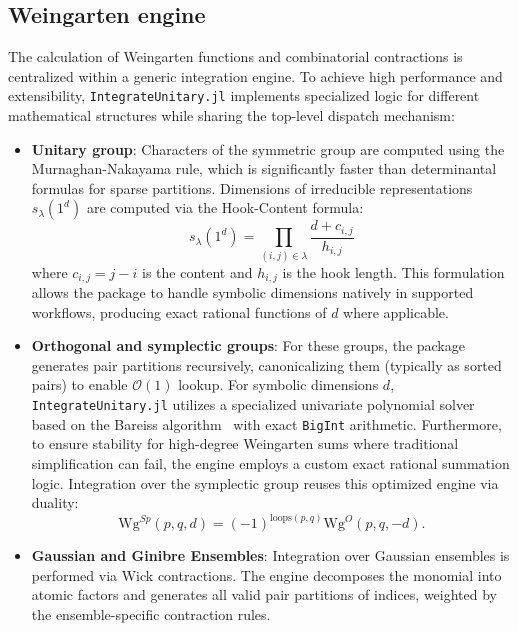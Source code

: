 \documentclass[manuscript,screen]{acmart}
\begin{document}
\subsection{Weingarten engine}
The calculation of Weingarten functions and combinatorial contractions is
centralized within a generic integration engine. To achieve high performance
and extensibility, \texttt{IntegrateUnitary.jl} implements specialized logic for different
mathematical structures while sharing the top-level dispatch mechanism:
\begin{itemize}
    \item \textbf{Unitary group}: Characters of the symmetric group are computed
    using the Murnaghan-Nakayama rule, which is significantly faster than determinantal
    formulas for sparse partitions. Dimensions of irreducible representations $s_\lambda(1^d)$
    are computed via the Hook-Content formula:
    \begin{equation}
    s_\lambda(1^d) = \prod_{(i,j) \in \lambda} \frac{d + c_{i,j}}{h_{i,j}}
    \end{equation}
    where $c_{i,j} = j-i$ is the content and $h_{i,j}$ is the hook length. This formulation
    allows the package to handle symbolic dimensions natively in supported workflows,
    producing exact rational functions of $d$ where applicable.
    \item \textbf{Orthogonal and symplectic groups}: For these groups, the package generates pair partitions
    recursively, canonicalizing them (typically as sorted pairs) to enable $\mathcal{O}(1)$ lookup.
    For symbolic dimensions $d$, \texttt{IntegrateUnitary.jl} utilizes a specialized univariate polynomial
    solver based on the Bareiss algorithm~\cite{bareiss1968sylvester} with exact \texttt{BigInt} arithmetic.
    Furthermore, to ensure stability for high-degree Weingarten sums where traditional
    simplification can fail, the engine employs a custom exact rational summation logic.
    Integration over the symplectic group reuses this optimized engine via duality:
    \begin{equation}
    \mathrm{Wg}^{Sp}(p, q, d) = (-1)^{\mathrm{loops}(p, q)} \mathrm{Wg}^O(p, q, -d).
    \end{equation}
    \item \textbf{Gaussian and Ginibre Ensembles}: Integration over Gaussian
    ensembles is performed via Wick contractions. The engine decomposes the
    monomial into atomic factors and generates all valid pair partitions of
    indices, weighted by the ensemble-specific contraction rules.

\end{itemize}
\end{document}
